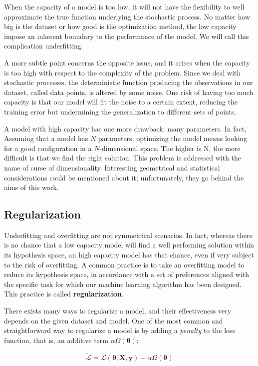 \documentclass[a4paper, twoside]{article}
\begin{document}
        When the capacity of a model is too low, it will not have the flexibility to well approximate the true function underlying the stochastic process. No matter how big is the dataset or how good is the optimization method, the low capacity impose an inherent boundary to the performance of the model. We will call this complication underfitting.

        A more subtle point concerns the opposite issue, and it arises when the capacity is too high with respect to the complexity of the problem. Since we deal with stochastic processes, the deterministic function producing the observations in our dataset, called data points, is altered by some noise. One risk of having too much capacity is that our model will fit the noise to a certain extent, reducing the training error but undermining the generalization to different sets of points.

        A model with high capacity has one more drawback: many parameters. In fact, Assuming that a model has $N$ parameters, optimizing the model means looking for a good configuration in a $N$-dimensional space. The higher is N, the more difficult is that we find the right solution. This problem is addressed with the name of curse of dimensionality. Interesting geometrical and statistical considerations could be mentioned about it; unfortunately, they go behind the aims of this work.

    \subsection{Regularization}
    Underfitting and overfitting are not symmetrical scenarios. In fact, whereas there is no chance that a low capacity model will find a well performing solution within its hypothesis space, an high capacity model has that chance, even if very subject to the risk of overfitting. A common practice is to take an overfitting model to reduce its hypothesis space, in accordance with a set of preferences aligned with the specific task for which our machine learning algorithm has been designed. This practice is called \textbf{regularization}.

    There exists many ways to regularize a model, and their effectiveness very depends on the given dataset and model. One of the most common and straightforward way to regularize a model is by adding a \textit{penalty} to the loss function, that is, an additive term $\alpha \Omega(\boldsymbol{\theta})$:

    $$\widetilde{\mathcal{L}} = \mathcal{L}(\boldsymbol{\theta}; \boldsymbol{X}, \boldsymbol{y}) + \alpha \Omega(\boldsymbol{\theta})$$
\end{document}
